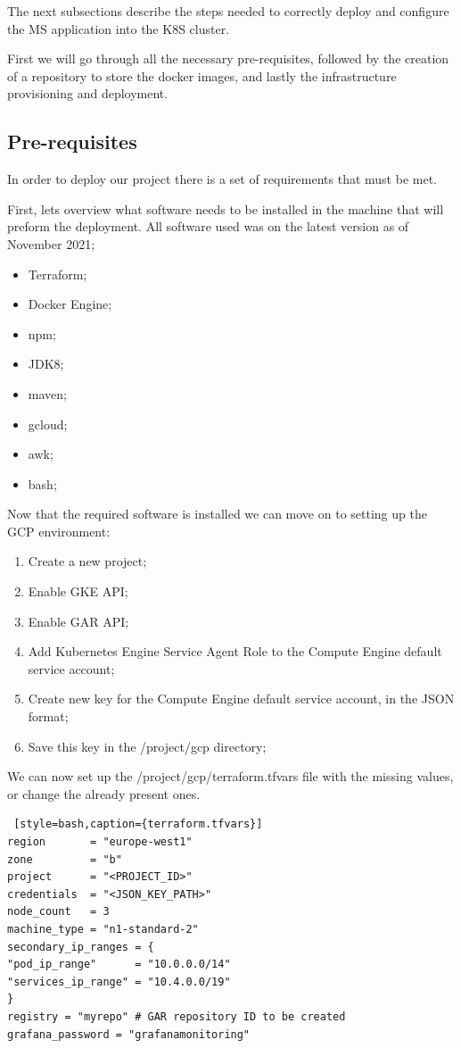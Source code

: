 \documentclass[12pt,a4paper,oneside]{report}
\begin{document}
The next subsections describe the steps needed to correctly deploy and configure the \ac{MS} application into the \ac{K8S} cluster. 

First we will go through all the necessary pre-requisites, followed by the creation of a repository to store the docker images, and lastly the infrastructure provisioning and deployment.



\subsection{Pre-requisites}
In order to deploy our project there is a set of requirements that must be met.

First, lets overview what software needs to be installed in the machine that will preform the deployment. All software used was on the latest version as of November 2021;
\begin{itemize}
\item Terraform;
\item Docker Engine;
\item npm;
\item JDK8;
\item maven;
\item gcloud;
\item awk;
\item bash;
\end{itemize}

Now that the required software is installed we can move on to setting up the \ac{GCP} environment:
\begin{enumerate}
\item Create a new project;
\item Enable \ac{GKE} API;
\item Enable \ac{GAR} API;
\item Add Kubernetes Engine Service Agent Role to the Compute Engine default service account;
\item Create new key for the Compute Engine default service account, in the JSON format;
\item Save this key in the /project/gcp directory;
\end{enumerate}

We can now set up the /project/gcp/terraform.tfvars file with the missing values, or change the already present ones.
\begin{lstlisting} [style=bash,caption={terraform.tfvars}]
region       = "europe-west1"
zone         = "b"
project      = "<PROJECT_ID>"
credentials  = "<JSON_KEY_PATH>"
node_count   = 3
machine_type = "n1-standard-2"
secondary_ip_ranges = {
"pod_ip_range"      = "10.0.0.0/14"
"services_ip_range" = "10.4.0.0/19"
}
registry = "myrepo" # GAR repository ID to be created
grafana_password = "grafanamonitoring"
\end{lstlisting}
\end{document}
